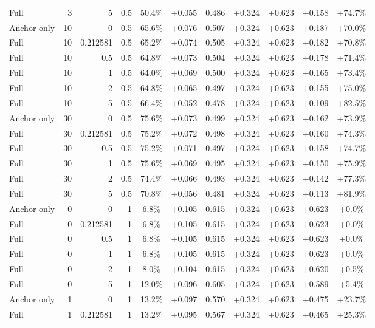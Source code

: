 \begin{table}[htbp]
\begin{tabular}{lrrrccccccc}
Full & 3 & 5 & 0.5 & 50.4\% & +0.055 & 0.486 & +0.324 & +0.623 & +0.158 & +74.7\% \\
Anchor only & 10 & 0 & 0.5 & 65.6\% & +0.076 & 0.507 & +0.324 & +0.623 & +0.187 & +70.0\% \\
Full & 10 & 0.212581 & 0.5 & 65.2\% & +0.074 & 0.505 & +0.324 & +0.623 & +0.182 & +70.8\% \\
Full & 10 & 0.5 & 0.5 & 64.8\% & +0.073 & 0.504 & +0.324 & +0.623 & +0.178 & +71.4\% \\
Full & 10 & 1 & 0.5 & 64.0\% & +0.069 & 0.500 & +0.324 & +0.623 & +0.165 & +73.4\% \\
Full & 10 & 2 & 0.5 & 64.8\% & +0.065 & 0.497 & +0.324 & +0.623 & +0.155 & +75.0\% \\
Full & 10 & 5 & 0.5 & 66.4\% & +0.052 & 0.478 & +0.324 & +0.623 & +0.109 & +82.5\% \\
Anchor only & 30 & 0 & 0.5 & 75.6\% & +0.073 & 0.499 & +0.324 & +0.623 & +0.162 & +73.9\% \\
Full & 30 & 0.212581 & 0.5 & 75.2\% & +0.072 & 0.498 & +0.324 & +0.623 & +0.160 & +74.3\% \\
Full & 30 & 0.5 & 0.5 & 75.2\% & +0.071 & 0.497 & +0.324 & +0.623 & +0.158 & +74.7\% \\
Full & 30 & 1 & 0.5 & 75.6\% & +0.069 & 0.495 & +0.324 & +0.623 & +0.150 & +75.9\% \\
Full & 30 & 2 & 0.5 & 74.4\% & +0.066 & 0.493 & +0.324 & +0.623 & +0.142 & +77.3\% \\
Full & 30 & 5 & 0.5 & 70.8\% & +0.056 & 0.481 & +0.324 & +0.623 & +0.113 & +81.9\% \\
Anchor only & 0 & 0 & 1 & 6.8\% & +0.105 & 0.615 & +0.324 & +0.623 & +0.623 & +0.0\% \\
Full & 0 & 0.212581 & 1 & 6.8\% & +0.105 & 0.615 & +0.324 & +0.623 & +0.623 & +0.0\% \\
Full & 0 & 0.5 & 1 & 6.8\% & +0.105 & 0.615 & +0.324 & +0.623 & +0.623 & +0.0\% \\
Full & 0 & 1 & 1 & 6.8\% & +0.105 & 0.615 & +0.324 & +0.623 & +0.623 & +0.0\% \\
Full & 0 & 2 & 1 & 8.0\% & +0.104 & 0.615 & +0.324 & +0.623 & +0.620 & +0.5\% \\
Full & 0 & 5 & 1 & 12.0\% & +0.096 & 0.605 & +0.324 & +0.623 & +0.589 & +5.4\% \\
Anchor only & 1 & 0 & 1 & 13.2\% & +0.097 & 0.570 & +0.324 & +0.623 & +0.475 & +23.7\% \\
Full & 1 & 0.212581 & 1 & 13.2\% & +0.095 & 0.567 & +0.324 & +0.623 & +0.465 & +25.3\% \\

\end{tabular}
\end{table}
